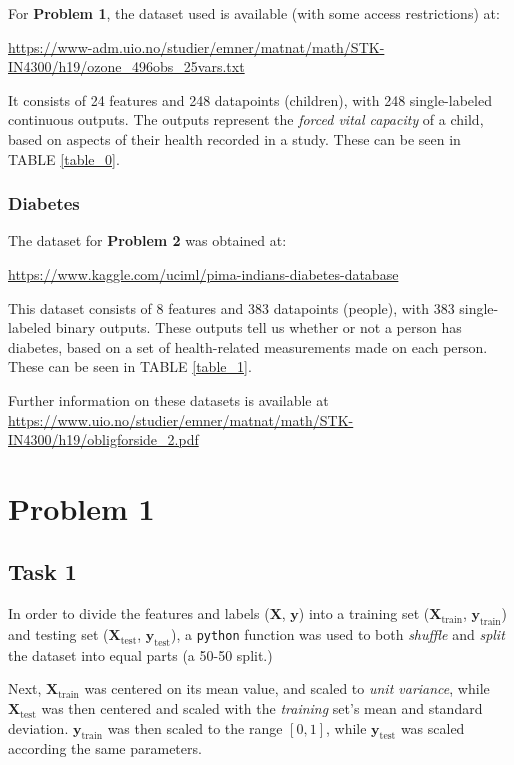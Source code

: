 \documentclass[twoside,twocolumn,10pt]{revtex4-1}
\begin{document}
	For \textbf{Problem 1}, the dataset used is available (with some access restrictions) at:
	
	\url{https://www-adm.uio.no/studier/emner/matnat/math/STK-IN4300/h19/ozone\_496obs\_25vars.txt}
	
	It consists of 24 features and 248 datapoints (children), with 248 single-labeled continuous outputs.  The outputs represent the \textit{forced vital capacity} of a child, based on aspects of their health recorded in a study. These can be seen in TABLE \ref{table_0}.
	
	\subsubsection{Diabetes}	
	
	The dataset for \textbf{Problem 2} was obtained at:
	
	\url{https://www.kaggle.com/uciml/pima-indians-diabetes-database}
	
	This dataset consists of 8 features and 383 datapoints (people), with 383 single-labeled binary outputs.  These outputs tell us whether or not a person has diabetes, based on a set of health-related measurements made on each person. These can be seen in TABLE \ref{table_1}.
		
	Further information on these datasets is available at \url{https://www.uio.no/studier/emner/matnat/math/STK-IN4300/h19/obligforside\_2.pdf}
	
	\section{Problem 1}
	
	\subsection*{Task 1}
	
	In order to divide the features and labels ($\mathbf{X}$, $\mathbf{y}$) into a training set ($\mathbf{X}_\text{train}$, $\mathbf{y}_\text{train}$) and testing set ($\mathbf{X}_\text{test}$, $\mathbf{y}_\text{test}$), a \texttt{python} function was used to both \textit{shuffle} and \textit{split} the dataset into equal parts (a 50-50 split.)  
	
	Next, $\mathbf{X}_\text{train}$ was centered on its mean value, and scaled to \textit{unit variance}, while $\mathbf{X}_\text{test}$ was then centered and scaled with the \textit{training} set's mean and standard deviation.  $\mathbf{y}_\text{train}$ was then scaled to the range $[0,1]$, while $\mathbf{y}_\text{test}$ was scaled according the same parameters.
	
\end{document}
